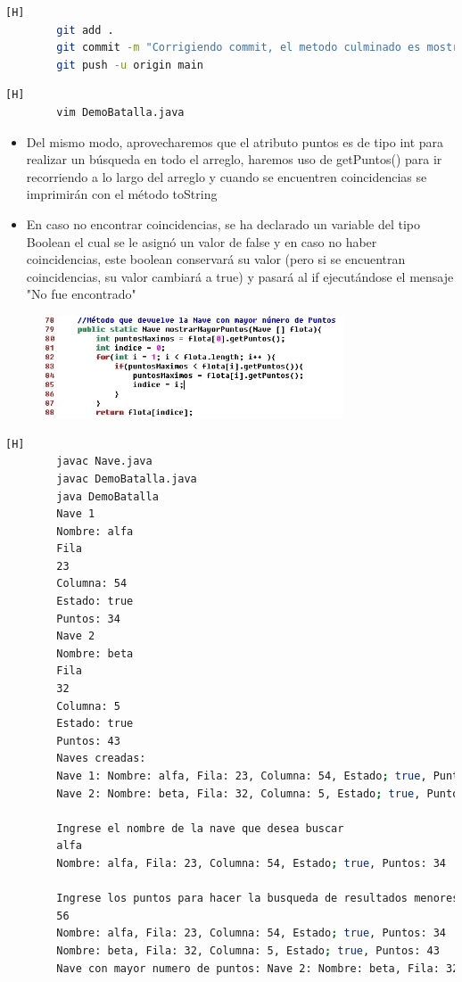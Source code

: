 \documentclass{article}
\begin{document}
	

	\begin{lstlisting}[language=bash,caption={Commit: Corrigiendo commit, el metodo culminado es mostrarPorPuntos }][H]
		git add .
		git commit -m "Corrigiendo commit, el metodo culminado es mostrarPorPuntos"			
		git push -u origin main
	\end{lstlisting}
	
	
	\begin{lstlisting}[language=bash,caption={Método mostrarMayorPuntos  }][H]
		vim DemoBatalla.java
	\end{lstlisting}
	
	\begin{itemize}	
		\item Del mismo modo, aprovecharemos que el atributo puntos  es de tipo int para realizar un búsqueda en todo el arreglo, haremos uso de getPuntos() para ir recorriendo a lo largo del arreglo y cuando se encuentren coincidencias se imprimirán con el método toString
		\item En caso no encontrar coincidencias, se ha declarado un variable del tipo Boolean el cual se le asignó un valor de false y en caso no haber coincidencias, este boolean conservará su valor (pero si se encuentran coincidencias, su valor cambiará a true) y pasará al if ejecutándose el mensaje "No fue encontrado"
	\end{itemize}
	
	\begin{figure}[H]
		\centering
		\includegraphics[width=0.8\textwidth,keepaspectratio]{img/7.jpg}
	\end{figure}
	
	\begin{lstlisting}[language=bash,caption={Compilando y ejecutando el programa con 2 elementos en el arreglo  }][H]
		javac Nave.java
		javac DemoBatalla.java
		java DemoBatalla
		Nave 1
		Nombre: alfa
		Fila
		23
		Columna: 54
		Estado: true
		Puntos: 34
		Nave 2
		Nombre: beta
		Fila
		32
		Columna: 5
		Estado: true
		Puntos: 43
		Naves creadas:
		Nave 1: Nombre: alfa, Fila: 23, Columna: 54, Estado; true, Puntos: 34
		Nave 2: Nombre: beta, Fila: 32, Columna: 5, Estado; true, Puntos: 43
		
		Ingrese el nombre de la nave que desea buscar
		alfa
		Nombre: alfa, Fila: 23, Columna: 54, Estado; true, Puntos: 34
		
		Ingrese los puntos para hacer la busqueda de resultados menores o igual
		56
		Nombre: alfa, Fila: 23, Columna: 54, Estado; true, Puntos: 34
		Nombre: beta, Fila: 32, Columna: 5, Estado; true, Puntos: 43
		Nave con mayor numero de puntos: Nave 2: Nombre: beta, Fila: 32, Columna: 5, Estado; true,
	\end{lstlisting}
	
\end{document}
